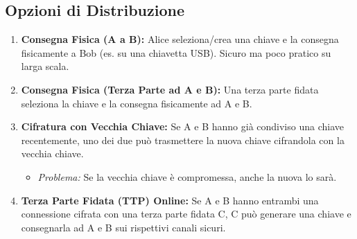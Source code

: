 \documentclass{article}
\begin{document}
\subsection{Opzioni di Distribuzione}
\begin{enumerate}
    \item \textbf{Consegna Fisica (A a B):} Alice seleziona/crea una chiave e la consegna fisicamente a Bob (es. su una chiavetta USB). Sicuro ma poco pratico su larga scala.
    \item \textbf{Consegna Fisica (Terza Parte ad A e B):} Una terza parte fidata seleziona la chiave e la consegna fisicamente ad A e B.
    \item \textbf{Cifratura con Vecchia Chiave:} Se A e B hanno già condiviso una chiave recentemente, uno dei due può trasmettere la nuova chiave cifrandola con la vecchia chiave.
        \begin{itemize}
            \item \textit{Problema:} Se la vecchia chiave è compromessa, anche la nuova lo sarà.
        \end{itemize}
    \item \textbf{Terza Parte Fidata (TTP) Online:} Se A e B hanno entrambi una connessione cifrata con una terza parte fidata C, C può generare una chiave e consegnarla ad A e B sui rispettivi canali sicuri.
\end{enumerate}
\end{document}
